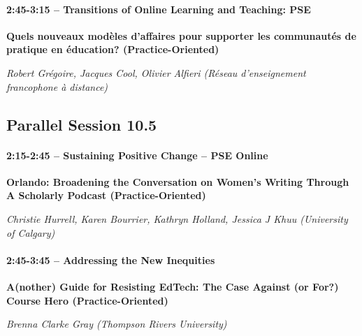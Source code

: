 \documentclass[
]{book}
\begin{document}
\begin{secondary}
\hypertarget{transitions-of-online-learning-and-teaching-pse}{%
\paragraph{2:45-3:15 -- Transitions of Online Learning and Teaching:
PSE}\label{transitions-of-online-learning-and-teaching-pse}}

\textbf{Quels nouveaux modèles d'affaires pour supporter les communautés
de pratique en éducation? (Practice-Oriented)}

\emph{Robert Grégoire, Jacques Cool, Olivier Alfieri (Réseau
d'enseignement francophone à distance)}
\end{secondary}

\hypertarget{parallel-session-10.5}{%
\subsection*{Parallel Session 10.5}\label{parallel-session-10.5}}

\begin{secondary}
\hypertarget{sustaining-positive-change-pse-online}{%
\paragraph{2:15-2:45 -- Sustaining Positive Change -- PSE
Online}\label{sustaining-positive-change-pse-online}}

\textbf{Orlando: Broadening the Conversation on Women's Writing Through
A Scholarly Podcast (Practice-Oriented)}

\emph{Christie Hurrell, Karen Bourrier, Kathryn Holland, Jessica J Khuu
(University of Calgary)}
\end{secondary}

\begin{secondary}
\hypertarget{addressing-the-new-inequities}{%
\paragraph{2:45-3:45 -- Addressing the New
Inequities}\label{addressing-the-new-inequities}}

\textbf{A(nother) Guide for Resisting EdTech: The Case Against (or For?)
Course Hero (Practice-Oriented)}

\emph{Brenna Clarke Gray (Thompson Rivers University)}
\end{secondary}
\end{document}
